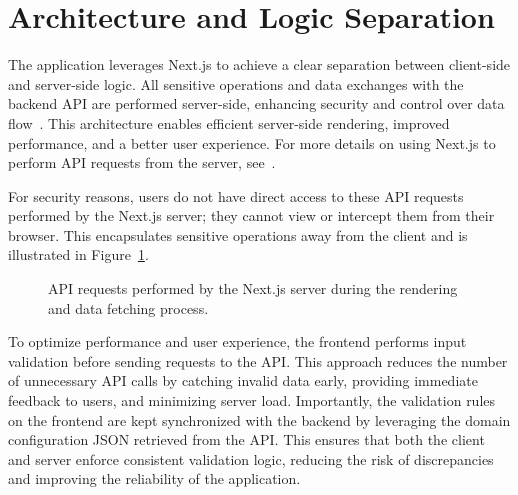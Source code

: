 \section{Architecture and Logic Separation}

The application leverages Next.js to achieve a clear separation between client-side and server-side logic. All sensitive operations and data exchanges with the backend API are performed server-side, enhancing security and control over data flow~\cite{nextjs-server-client-components,nextjs-data-fetching}. This architecture enables efficient server-side rendering, improved performance, and a better user experience. For more details on using Next.js to perform API requests from the server, see~\cite{auth0-nextjs-server-actions}.

For security reasons, users do not have direct access to these API requests performed by the Next.js server; they cannot view or intercept them from their browser. This encapsulates sensitive operations away from the client and is illustrated in Figure~\ref{fig:next-server-api-calls}.

\begin{figure}[H]
    \centering
    
    \caption{API requests performed by the Next.js server during the rendering and data fetching process.}
    \label{fig:next-server-api-calls}
\end{figure}

To optimize performance and user experience, the frontend performs input validation before sending requests to the API. This approach reduces the number of unnecessary API calls by catching invalid data early, providing immediate feedback to users, and minimizing server load. Importantly, the validation rules on the frontend are kept synchronized with the backend by leveraging the domain configuration JSON retrieved from the API. This ensures that both the client and server enforce consistent validation logic, reducing the risk of discrepancies and improving the reliability of the application.

